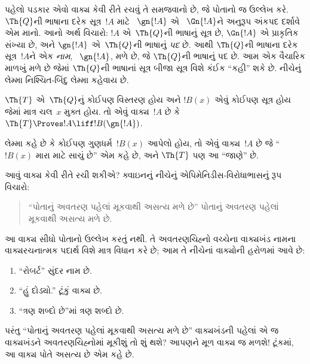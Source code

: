 પહેલો પડકાર એવો
વાક્ય કેવી રીતે
રચવું તે સમજવાનો છે,
જે પોતાનો જ ઉલ્લેખ કરે.
$\Th{Q}$ની ભાષાના દરેક
સૂત્ર~$!A$ માટે
~$\gn{!A}$ એ
~$\Gn{!A}$ને અનુરૂપ
અંકપદ દર્શાવે એમ માનો.
આનો અર્થ વિચારો:
$!A$ એ~$\Th{Q}$ની
ભાષાનું સૂત્ર છે,
$\Gn{!A}$ એ પ્રાકૃતિક
સંખ્યા છે, અને
$\gn{!A}$ એ~$\Th{Q}$ની
ભાષાનું \emph{પદ} છે.
આથી $\Th{Q}$ની ભાષાના
દરેક સૂત્ર~$!A$ને
એક \emph{નામ},
~$\gn{!A}$, મળે છે,
જે $\Th{Q}$ની ભાષાનું
પદ છે. આમ એક વૈચારિક
માળખું મળે છે જેમાં
$\Th{Q}$ની ભાષાનાં
સૂત્ર બીજા
સૂત્ર વિશે કંઈક
``કહી'' શકે છે.
નીચેનું લેમ્મા નિશ્ચિત-બિંદુ
લેમ્મા કહેવાય છે.

\begin{lem}
$\Th{T}$ એ~$\Th{Q}$નું
કોઈપણ વિસ્તરણ હોય અને
$!B(x)$ એવું કોઈપણ
સૂત્ર હોય જેમાં
માત્ર ચલ~$x$ મુક્ત હોય.
તો એવું વાક્ય~$!A$
છે કે
$\Th{T} \Proves!A \liff !B(\gn{!A})$.
\end{lem}

લેમ્મા કહે છે કે કોઈપણ
ગુણધર્મ~$!B(x)$ આપેલો
હોય, તો એવું
વાક્ય~$!A$ છે
જે ``$!B(x)$ મારા માટે
સાચું છે'' એમ કહે છે,
અને $\Th{T}$ પણ આ
``જાણે'' છે.

આવું વાક્ય કેવી
રીતે રચી શકીએ?
ક્વાઇનનું નીચેનું
એપિમેનિડીસ-વિરોધાભાસનું
રૂપ વિચારો:
\begin{quote}
``પોતાનું અવતરણ પહેલાં
મૂકવાથી અસત્ય મળે છે''
પોતાનું અવતરણ પહેલાં
મૂકવાથી અસત્ય મળે છે.
\end{quote}
આ વાક્ય સીધો પોતાનો
ઉલ્લેખ કરતું નથી.
તે અવતરણચિહ્નો વચ્ચેના
વાક્યખંડ નામના વાક્યરચનાત્મક
પદાર્થ વિશે માત્ર વિધાન
કરે છે; આમ તે નીચેનાં
વાક્યોની હરોળમાં આવે છે:
\begin{enumerate}
\item ``રોબર્ટ'' સુંદર નામ છે.
\item ``હું દોડ્યો.'' ટૂંકું વાક્ય છે.
\item ``ત્રણ શબ્દો છે''માં ત્રણ શબ્દો છે.
\end{enumerate}
પરંતુ ``પોતાનું અવતરણ
પહેલાં મૂકવાથી અસત્ય મળે
છે'' વાક્યખંડની પહેલાં
એ જ વાક્યખંડને
અવતરણચિહ્નોમાં મૂકીશું
તો શું થશે? આપણને
મૂળ વાક્ય જ મળશે!{}
ટૂંકમાં, આ વાક્ય પોતે
અસત્ય છે એમ કહે છે.
\endgroup


\begingroup
\makeatletter{}\makeatother


\label{guunit:OLP-0314}


